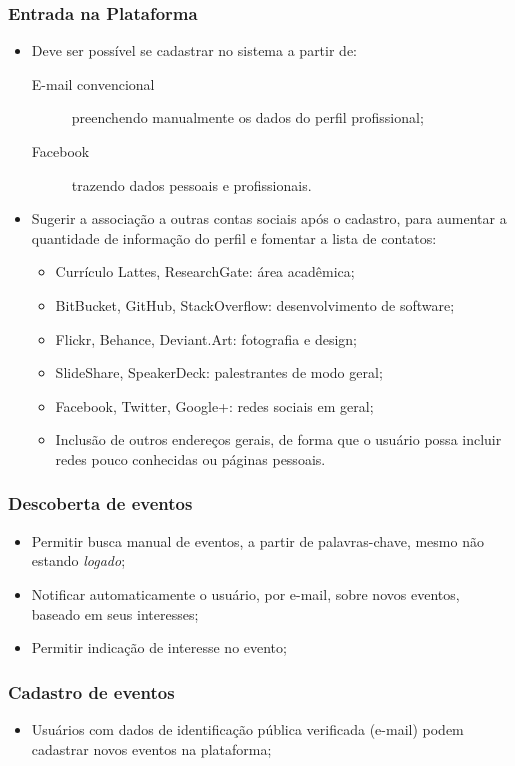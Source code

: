 \documentclass[12pt,a4paper,twoside,hyphens,english,brazil]{abntex2}
\begin{document}
\subsubsection*{Entrada na Plataforma}
\begin{itemize}
\item Deve ser possível se cadastrar no sistema a partir de:
	\begin{description}
		\item[E-mail convencional] preenchendo manualmente os dados do perfil profissional;
		\item[Facebook] trazendo dados pessoais e profissionais.
	\end{description}
\item Sugerir a associação a outras contas sociais após o cadastro, para aumentar a quantidade de informação do perfil e fomentar a lista de contatos:
	\begin{itemize}[itemsep=-1ex]
		\item Currículo Lattes, ResearchGate: área acadêmica;
		\item BitBucket, GitHub, StackOverflow: desenvolvimento de software;
		\item Flickr, Behance, Deviant.Art: fotografia e design;
		\item SlideShare, SpeakerDeck: palestrantes de modo geral;
		\item Facebook, Twitter, Google+: redes sociais em geral;
		\item Inclusão de outros endereços gerais, de forma que o usuário possa incluir redes pouco conhecidas ou páginas pessoais.
	\end{itemize}
\end{itemize}

\subsubsection*{Descoberta de eventos}
\begin{itemize}
	\item Permitir busca manual de eventos, a partir de palavras-chave, mesmo não estando \textit{logado};
	\item Notificar automaticamente o usuário, por e-mail, sobre novos eventos, baseado em seus interesses;
	\item Permitir indicação de interesse no evento;
\end{itemize}

\subsubsection*{Cadastro de eventos}
\begin{itemize}
	\item Usuários com dados de identificação pública verificada (e-mail) podem cadastrar novos eventos na plataforma;
\end{itemize}
\end{document}

